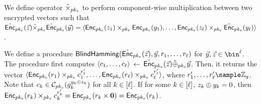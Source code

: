 We define operator $\homomorphicMulVec{\encryptPubKey}$ to perform component-wise multiplication between two encrypted vectors such that 
$\pkencryptVec[\encryptPubKey](\genericVec) 
\homomorphicMulVec{\encryptPubKey} \pkencryptVec[\encryptPubKey](\clientVec) = \langle \pkencrypt[\encryptPubKey](\genericVec[1]) \homomorphicMul{\encryptPubKey}
\pkencrypt[\encryptPubKey](\clientVec[1]), \dots,  \pkencrypt[\encryptPubKey](\genericVec[\genericVecLen]) \homomorphicMul{\encryptPubKey}
\pkencryptVec[\encryptPubKey](\clientVec[\genericVecLen])\rangle$. 



%
We define a procedure $\blindedHD(\pkencryptVec[\encryptPubKey](\genericVec), \clientVec, \genericRand[1], \dots, \genericRand[\genericVecLen])$ for 
$\clientVec, \genericVec \in \bin^{\genericVecLen}$. The procedure first computes $\langle \ciphertext_1, \dots, \ciphertext_{\genericVecLen} \rangle$ $\gets$  $\pkencryptVec[\encryptPubKey](\genericVec) \homomorphicXORVec{\encryptPubKey} \clientVec$. Then, it returns the vector $\langle \pkencrypt[\encryptPubKey](\genericRand[1]) \homomorphicMul{\encryptPubKey} \ciphertext_1^{\genericRandAlt[1]}, \dots, \pkencrypt[\encryptPubKey](\genericRand[\genericVecLen]) \homomorphicMul{\encryptPubKey} \ciphertext_{\genericVecLen}^{\genericRandAlt[\genericVecLen]} \rangle$, where $\genericRandAlt[1], \dots, \genericRandAlt[\genericVecLen] \sample \integersModArg{\groupOrder}$. Note that $\ciphertext_\vecIdx \in \ciphertextSpace[\encryptPubKey](\grpGen_{\vecIdx}^{\clientVec[\vecIdx] \oplus \genericVec[\vecIdx]})$ for all $\vecIdx \in \nats[\genericVecLen]$. 
If for some $\vecIdx \in \nats[\genericVecLen]$, $\genericVec[\vecIdx] \oplus \clientVec[\vecIdx] = 0$, then $\pkencrypt[\encryptPubKey](\genericRand[\vecIdx]) \homomorphicMul{\encryptPubKey} \ciphertext_{\vecIdx}^{\genericRandAlt[\vecIdx]} = \pkencrypt[\encryptPubKey](\genericRand[\vecIdx] \times \groupIdentity) = \pkencrypt[\encryptPubKey](\genericRand[\vecIdx])$. 
\fi 



